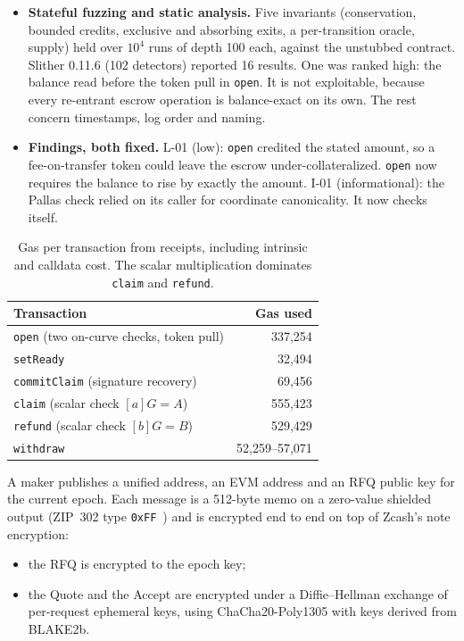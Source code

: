 \documentclass[10pt,letterpaper]{article}
\makeatletter
\renewcommand\section{\@startsection{section}{1}{\z@}{-1.3em}{0.45em}{\normalfont\large\bfseries}}
\theoremstyle{plain}
\theoremstyle{definition}
\newcommand{\fn}[1]{\texttt{#1}}
\makeatother
\begin{document}
\begin{itemize}
mutants are beyond symbolic execution and were caught by concrete tests. One of them revealed a
missing test for alias scalars $k+Q$, which we added.
\item \textbf{Stateful fuzzing and static analysis.} Five invariants (conservation, bounded credits,
exclusive and absorbing exits, a per-transition oracle, supply) held over $10^4$ runs of depth 100
each, against the unstubbed contract. Slither 0.11.6 (102 detectors) reported 16 results. One was
ranked high: the balance read before the token pull in \fn{open}. It is not exploitable, because
every re-entrant escrow operation is balance-exact on its own. The rest concern timestamps, log
order and naming.
\item \textbf{Findings, both fixed.} L-01 (low): \fn{open} credited the stated amount, so a
fee-on-transfer token could leave the escrow under-collateralized. \fn{open} now requires the
balance to rise by exactly the amount. I-01 (informational): the Pallas check relied on its caller
for coordinate canonicality. It now checks itself.
\end{itemize}

\begin{table}[H]
\centering\small
\begin{tabular}{@{}lr@{}}
\toprule
\textbf{Transaction} & \textbf{Gas used}\\
\midrule
\fn{open} (two on-curve checks, token pull) & 337{,}254\\
\fn{setReady} & 32{,}494\\
\fn{commitClaim} (signature recovery) & 69{,}456\\
\fn{claim} (scalar check $[a]G=A$) & 555{,}423\\
\fn{refund} (scalar check $[b]G=B$) & 529{,}429\\
\fn{withdraw} & 52{,}259--57{,}071\\
\bottomrule
\end{tabular}
\caption{Gas per transaction from receipts, including intrinsic and calldata cost. The scalar
multiplication dominates \fn{claim} and \fn{refund}.}
\end{table}

\section{Messages}
A maker publishes a unified address, an EVM address and an RFQ public key for the current epoch.
Each message is a 512-byte memo on a zero-value shielded output (ZIP~302 type
\texttt{0xFF}~\cite{zip302}) and is encrypted end to end on top of Zcash's note encryption:
\begin{itemize}\setlength\itemsep{0.05em}
\item the RFQ is encrypted to the epoch key;
\item the Quote and the Accept are encrypted under a Diffie--Hellman exchange of per-request
ephemeral keys, using ChaCha20-Poly1305 with keys derived from BLAKE2b.
\end{itemize}
\end{document}
